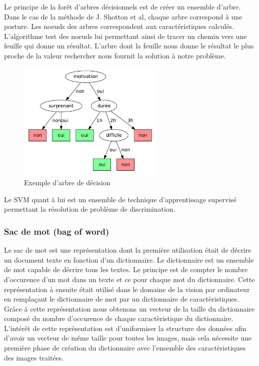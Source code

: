 Le principe de la forêt d'arbres décisionnels\cite{randomDecisionForest} est de créer un ensemble d'arbre.
Dans le cas de la méthode de J. Shotton et al\cite{kinectSegmentation}, chaque arbre correspond à une posture.
Les noeuds des arbres correspondent aux caractéristiques calculés. L'algorithme test des noeuds lui permettant ainsi de tracer un
chemin vers une feuille qui donne un résultat. L'arbre dont la feuille nous donne le résultat le plus proche 
de la valeur rechercher nous fournit la solution à notre problème.\\

\begin{figure}[!ht]
  \begin{center}
    \includegraphics[width=7cm]{image/randomForest.png}
    \caption{Exemple d'arbre de décision}
  \end{center}
\end{figure}

Le SVM\cite{SVM} quant à lui est un ensemble de technique d'apprentissage supervisé permettant la résolution de 
problème de discrimination.

\subsubsection{Sac de mot (bag of word)}
Le sac de mot est une représentation dont la première utilisation était de décrire un document texte en fonction d'un dictionnaire.
Le dictionnaire est un ensemble de mot capable de décrire tous les textes.
Le principe est de compter le nombre d'occurence d'un mot dans un texte et ce pour chaque mot du dictionnaire. Cette représentation
à ensuite était utilisé dans le domaine de la vision par ordinateur\cite{BagOfWord} en remplaçant le dictionnaire de mot par un dictionnaire
de caractèristiques. Grâce à cette représentation nous obtenons un vecteur de la taille du dictionnaire composé du nombre 
d'occurence de chaque caractèristique du dictionnaire. L'intérêt de cette représentation est d'uniformiser la structure des données
afin d'avoir un vecteur de même taille pour toutes les images, mais cela nécessite une première phase de création du dictionnaire
avec l'ensemble des caractèristiques des images traitées.

